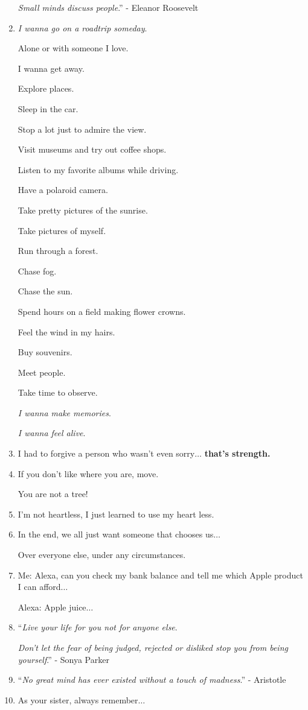 \documentclass{article}
\begin{document}
\begin{enumerate}
	\textit{Small minds discuss people}.'' - Eleanor Roosevelt
	\item \textit{I wanna go on a roadtrip someday}.
	
	Alone or with someone I love.
	
	I wanna get away.
	
	Explore places.
	
	Sleep in the car.
	
	Stop a lot just to admire the view.
	
	Visit museums and try out coffee shops.
	
	Listen to my favorite albums while driving.
	
	Have a polaroid camera.
	
	Take pretty pictures of the sunrise.
	
	Take pictures of myself.
	
	Run through a forest.
	
	Chase fog.
	
	Chase the sun.
	
	Spend hours on a field making flower crowns.
	
	Feel the wind in my hairs.
	
	Buy souvenirs.
	
	Meet people.
	
	Take time to observe.
	
	\textit{I wanna make memories}.
	
	\textit{I wanna feel alive}.
	\item I had to forgive a person who wasn't even sorry$\ldots$ \textbf{that's strength.}
	\item If you don't like where you are, move.
	
	You are not a tree!
	\item I'm not heartless, I just learned to use my heart less.
	\item In the end, we all just want someone that chooses us$\ldots$
	
	Over everyone else, under any circumstances.
	\item Me: Alexa, can you check my bank balance and tell me which Apple product I can afford$\ldots$
	
	Alexa: Apple juice$\ldots$
	\item ``\textit{Live your life for you not for anyone else}.
	
	\textit{Don't let the fear of being judged, rejected or disliked stop you from being yourself}.'' - Sonya Parker
	\item ``\textit{No great mind has ever existed without a touch of madness}.'' - Aristotle
	\item As your sister, always remember$\ldots$
	

\end{enumerate}
\end{document}
